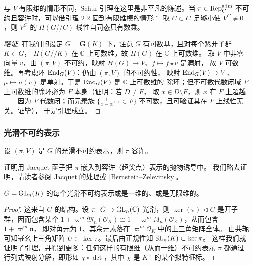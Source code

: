 与 $V$ 有限维的情形不同，Schur 引理在这里是非平凡的陈述。当
$\pi\in\mathrm{Rep}^{\mathrm{adm}}_G$ 不可约且容许时，可以借引理 2.2 回到有限维模的情形：
取 $C\subset G$ 足够小使 $V^{C}\neq 0$，则 $V^{C}$ 的 $H(G/\!/C)$-线性自同态只有数乘。

\begin{proof}[略证]
在我们的设定 $G=\mathbf{G}(K)$ 下，注意 $G$ 有可数基，且对每个紧开子群 $K\subset G$，
$H(G/\!/K)$ 在 $\mathbb{C}$ 上可数维，故 $H(G)$ 在 $\mathbb{C}$ 上可数维。
取 $V$ 中非零向量 $v$，由 $(\pi,V)$ 不可约，映射 $H(G)\to V$、$f\mapsto f\star v$ 是满射，
故 $V$ 可数维。再考虑环 $\mathrm{End}_G(V)$：仍由 $(\pi,V)$ 的不可约性，
映射 $\mathrm{End}_G(V)\to V$、$\mu\mapsto\mu(v)$ 是单射。于是 $\mathrm{End}_G(V)$ 是 $\mathbb{C}$ 上可数维的
除环；但不可数代数闭域 $F$ 上可数维的除环必为 $F$ 本身（证明：若 $D\neq F$，
取 $x\in D\setminus F$，则 $x$ 在 $F$ 上超越——因为 $F$ 代数闭；而元素族
$\{\frac{1}{x-\alpha}:\alpha\in F\}$ 不可数，且可验证其在 $F$ 上线性无关。证毕），
于是引理成立。
\end{proof}

\subsubsection{光滑不可约表示}

\begin{theorem}
设 $(\pi,V)$ 是 $G$ 的光滑不可约表示，则 $\pi$ 容许。
\end{theorem}

证明用 Jacquet 函子把 $\pi$ 嵌入到容许（超尖点）表示的抛物诱导中。
我们略去证明，请读者参阅 Jacquet 的处理或 [Bernstein--Zelevinsky]。

\begin{lemma}
$G=\mathrm{GL}_n(K)$ 的每个光滑不可约表示或是一维的、或是无限维的。
\end{lemma}

\begin{proof}
这来自 $G$ 的结构。设 $\pi\colon G\to\mathrm{GL}_n(\mathbb{C})$ 光滑，则
$\ker(\pi)\triangleleft G$ 是开子群，因而包含某个 $1+\varpi^{m}\mathfrak{M}_n(\mathcal{O}_K)
\cong 1+\varpi^{m}M_n(\mathcal{O}_K)$，从而包含 $1+\varpi^{m}\mathfrak{n}$，
即对角元为 $1$、其余元素落在 $\varpi^{m}\mathcal{O}_K$ 中的上三角矩阵全体。
由共轭可知幂幺上三角矩阵 $U\subset\ker\pi$。最后由正规性知 $\mathrm{SL}_n(K)\subset\ker\pi$。
这样我们就证明了引理，并得到更多：任何这样的有限维（从而一维）不可约表示 $\pi$
都通过行列式映射分解，即形如 $\chi\circ\det$，其中 $\chi$ 是 $K^{\times}$ 的某个拟特征标。
\end{proof}

